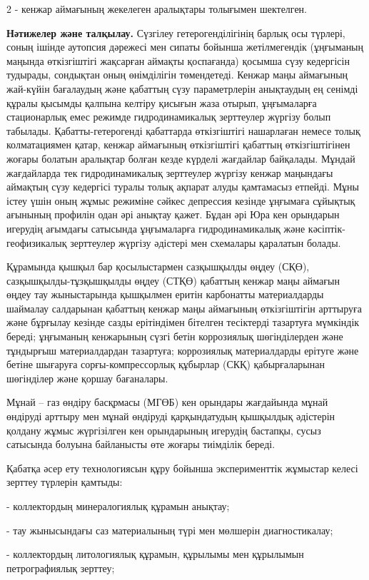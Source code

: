 \begin{multicols}{2}
- кенжар аймағының жекелеген аралықтары толығымен шектелген.

{\bfseries Нәтижелер және талқылау.} Сүзгілеу гетерогенділігінің барлық осы
түрлері, соның ішінде аутопсия дәрежесі мен сипаты бойынша жетілмегендік
(ұңғыманың маңында өткізгіштігі жақсарған аймақты қоспағанда) қосымша
сүзу кедергісін тудырады, сондықтан оның өнімділігін төмендетеді. Кенжар
маңы аймағының жай-күйін бағалаудың және қабаттың сүзу параметрлерін
анықтаудың ең сенімді құралы қысымды қалпына келтіру қисығын жаза
отырып, ұңғымаларға стационарлық емес режимде гидродинамикалық
зерттеулер жүргізу болып табылады. Қабатты-гетерогенді қабаттарда
өткізгіштігі нашарлаған немесе толық колматациямен қатар, кенжар
аймағының өткізгіштігі қабаттың өткізгіштігінен жоғары болатын аралықтар
болған кезде күрделі жағдайлар байқалады. Мұндай жағдайларда тек
гидродинамикалық зерттеулер жүргізу кенжар маңындағы аймақтың сүзу
кедергісі туралы толық ақпарат алуды қамтамасыз етпейді. Мұны істеу үшін
оның жұмыс режиміне сәйкес депрессия кезінде ұңғымаға сұйықтық ағынының
профилін одан әрі анықтау қажет. Бұдан әрі Юра кен орындарын игерудің
ағымдағы сатысында ұңғымаларға гидродинамикалық және
кәсіптік-геофизикалық зерттеулер жүргізу әдістері мен схемалары
қаралатын болады.

Құрамында қышқыл бар қосылыстармен сазқышқылды өңдеу (СҚӨ),
сазқышқылды-тұзқышқылды өңдеу (СТҚӨ) қабаттың кенжар маңы аймағын өңдеу
тау жыныстарында қышқылмен еритін карбонатты материалдарды шаймалау
салдарынан қабаттың кенжар маңы аймағының өткізгіштігін арттыруға және
бұрғылау кезінде сазды ерітіндімен бітелген тесіктерді тазартуға
мүмкіндік береді; ұңғыманың кенжарының сүзгі бетін коррозиялық
шөгінділерден және тұндырғыш материалдардан тазартуға; коррозиялық
материалдарды ерітуге және бетіне шығаруға сорғы-компрессорлық құбырлар
(СКҚ) қабырғаларынан шөгінділер және қоршау бағаналары.

Мұнай -- газ өндіру басқрмасы (МГӨБ) кен орындары жағдайында мұнай
өндіруді арттыру мен мұнай өндіруді қарқындатудың қышқылдық әдістерін
қолдану жұмыс жүргізілген кен орындарының игерудің бастапқы, сусыз
сатысында болуына байланысты өте жоғары тиімділік береді.

Қабатқа әсер ету технологиясын құру бойынша эксперименттік жұмыстар
келесі зерттеу түрлерін қамтыды:

- коллектордың минералогиялық құрамын анықтау;

- тау жынысындағы саз материалының түрі мен мөлшерін диагностикалау;

- коллектордың литологиялық құрамын, құрылымы мен құрылымын
петрографиялық зерттеу;


\end{multicols}
